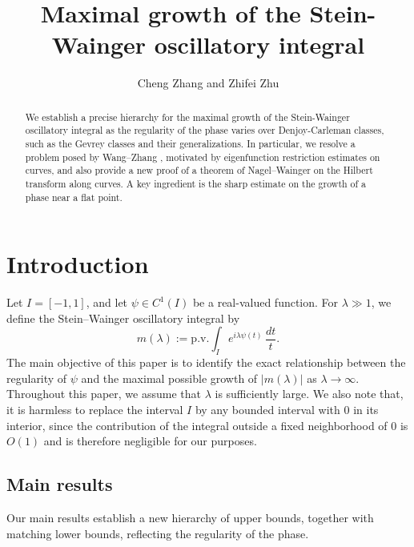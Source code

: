 \documentclass[11pt]{amsart}
\newcommand{\1}{{\rm 1\hspace*{-0.4ex}%
			\rule{0.1ex}{1.52ex}\hspace*{0.2ex}}}
\numberwithin{equation}{section}
\begin{document}
\title{Maximal growth of the Stein-Wainger oscillatory integral}
\author{ Cheng Zhang and Zhifei Zhu}

\address{Mathematical Sciences Center\\
	Tsinghua University\\
	Beijing, BJ 100084, China}
\date{}

\begin{abstract}
	We establish a precise hierarchy for the maximal growth of the Stein-Wainger oscillatory integral as the regularity of the phase varies over Denjoy-Carleman classes, such as the Gevrey classes and their generalizations. In particular, we resolve a problem posed by Wang--Zhang \cite{wz21}, motivated by eigenfunction restriction estimates on curves, and also provide a new proof of a theorem of Nagel--Wainger \cite{nw} on the Hilbert transform along curves. A key ingredient is the sharp estimate on the growth of a phase near a flat point. 
\end{abstract}
\maketitle
\section{Introduction}

Let $I=[-1,1]$, and let $\psi\in C^1(I)$ be a real-valued function. For $\lambda\gg1$, we define the Stein--Wainger oscillatory integral by
\begin{equation}\label{mla}
	m(\lambda)
	:=
	\mathrm{p.v.}\int_I e^{i\lambda\psi(t)}\,\frac{dt}{t}.
\end{equation}
The main objective of this paper is to identify the exact relationship between the regularity of $\psi$ and the maximal possible growth of $|m(\lambda)|$ as $\lambda\to\infty$. Throughout this paper, we assume that $\lambda$ is sufficiently large. We also note that, it is harmless to replace the interval $I$ by any bounded interval with $0$ in its interior, since the contribution of the integral outside a fixed neighborhood of $0$ is $O(1)$ and is therefore negligible for our purposes.

\subsection{Main results}
Our main results establish a new hierarchy of upper bounds, together with matching lower bounds, reflecting the regularity of the phase.
\end{document}
